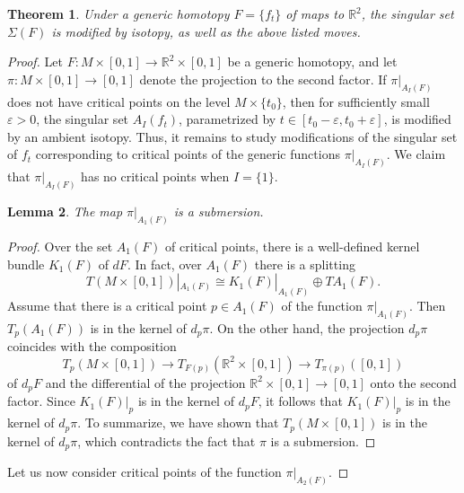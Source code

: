 \documentclass[12pt]{amsart}
\def \R{\mathbb{R}}
\def\co{\colon}
\newtheorem{theorem}{Theorem}[section]
\newtheorem{lemma}[theorem]{Lemma}
\theoremstyle{definition}
\begin{document}
\begin{theorem}\label{th:4}  Under a generic homotopy $F = \{f_t\}$ of maps to $\R^2$, the singular set $\Sigma(F)$ is modified by isotopy,  as well as the above listed moves.
\end{theorem}
\begin{proof}  Let $F\co M\times [0,1]\to \R^2\times [0,1]$ be a generic homotopy, and let $\pi\co M\times [0,1]\to [0,1]$ denote the projection to the second factor. If $\pi|_{A_I(F)}$ does not have critical points on the level $M\times \{t_0\}$, then for sufficiently small $\varepsilon>0$, the singular set $A_I(f_t)$,  parametrized by $t\in [t_0-\varepsilon, t_0+\varepsilon]$,  is modified by an ambient isotopy.  Thus, it remains to study modifications of the singular set of $f_t$ corresponding to critical points of the generic functions $\pi|_{A_I(F)}$.  We claim that $\pi|_{A_I(F)}$ has no critical points when $I=\{1\}$. 

\begin{lemma}\label{le:4}  The map $\pi|_{A_1(F)}$ is a submersion.
\end{lemma}
\begin{proof}   
Over the set $A_1(F)$ of critical points, there is a well-defined kernel bundle $K_1(F)$ of $dF$. In fact, over $A_1(F)$ there is a splitting  
\[
       T(M\times [0,1])|_{A_1(F)} \cong K_1(F)|_{A_1(F)} \oplus TA_1(F). 
\]
Assume that there is a critical point $p\in A_1(F)$ of the function $\pi|_{A_1(F)}$. Then $T_p(A_1(F))$ is in the kernel of $d_p\pi$. On the other hand, the projection $d_p\pi$ coincides with the composition 
\[
      T_p(M\times [0,1])\longrightarrow T_{F(p)}(\R^2\times [0,1])\longrightarrow T_{\pi(p)}([0,1])
\]
of $d_pF$ and the differential of the projection $\R^2\times [0,1]\to [0,1]$ onto the second factor. Since $K_1(F)|_p$ is in the kernel of $d_pF$, it follows that $K_1(F)|_p$ is in the kernel of $d_p\pi$. To summarize, we have shown that $T_p(M\times [0,1])$ is in the kernel of $d_p\pi$, which contradicts the fact that $\pi$ is a submersion.  
\end{proof}

\noindent Let us now consider critical points of the function $\pi|_{A_2(F)}$. 


\end{proof}
\end{document}

